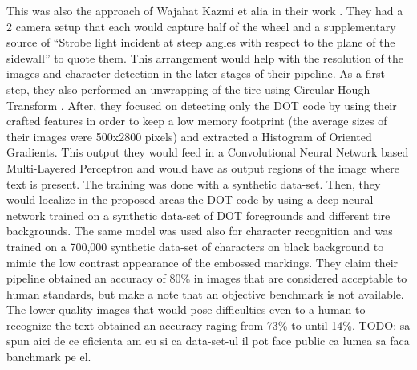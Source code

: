 This was also the approach of Wajahat Kazmi et alia in their work \cite{article:1}. They had a 2 camera setup that each would capture half of the wheel and a supplementary source of “Strobe light incident at steep angles with respect to the plane of the sidewall” to quote them. This arrangement would help with the resolution of the images and character detection in the later stages of their pipeline. As a first step, they also performed an unwrapping of the tire using Circular Hough Transform \cite{site:circular_hough_transform}. After, they focused on detecting only the DOT code by using their crafted features in order to keep a low memory footprint (the average sizes of their images were 500x2800 pixels) and extracted a Histogram of Oriented Gradients. This output they would feed in a Convolutional Neural Network based Multi-Layered Perceptron and would have as output regions of the image where text is present. The training was done with a synthetic data-set. Then, they would localize in the proposed areas the DOT code by using a deep neural network trained on a synthetic data-set of DOT foregrounds and different tire backgrounds. The same model was used also for character recognition and was trained on a 700,000 synthetic data-set of characters on black background to mimic the low contrast appearance of the embossed markings. They claim their pipeline obtained an accuracy of 80\% in images that are considered acceptable to human standards, but make a note that an objective benchmark is not available. The lower quality images that would pose difficulties even to a human to recognize the text obtained an accuracy raging from 73\% to until 14\%. TODO: sa spun aici de ce eficienta am eu si ca data-set-ul il pot face public ca lumea sa faca banchmark pe el.

